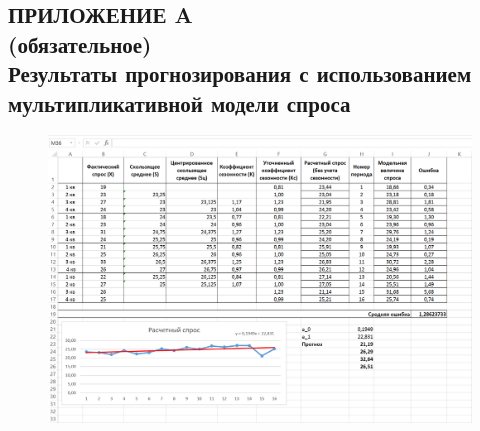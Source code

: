 \renewcommand{\thefigure}{\Asbuk{section}.\arabic{figure}}
\renewcommand{\thetable}{\Asbuk{section}.\arabic{table}}
\renewcommand{\thelstlisting}{\Asbuk{section}.\arabic{lstlisting}}

\begin{landscape}
\section*{%
  ПРИЛОЖЕНИЕ A \\
  (обязательное) \\
  Результаты прогнозирования с использованием
  мультипликативной модели спроса
}

\pagestyle{fancy}
\fancyhf{}  %
\fancyfoot[R]{\thepage}
\renewcommand{\headrulewidth}{0pt}
\renewcommand{\footrulewidth}{0pt}

\setlength{\headheight}{10mm}
\setlength{\headsep}{\baselineskip}

\thispagestyle{plain}

\setcounter{section}{1}
\setcounter{figure}{0}
\setcounter{table}{0}
\setcounter{lstlisting}{0}

\begin{figure}[h!]
  \centering
  \includegraphics[width=180mm]{pic/multiplicative}
\end{figure}

\end{landscape}
